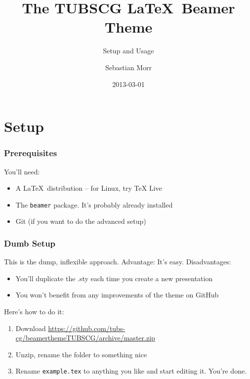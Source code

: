 \documentclass{beamer}
\title[TUBSCG Theme]{The TUBSCG \LaTeX\ Beamer Theme}
\subtitle{Setup and Usage}
\author[S.~Morr]{Sebastian Morr}
\institute{Computer Graphics Lab\\TU Braunschweig}
\date{2013-03-01}
\begin{document}
\begin{frame}
    \titlepage
\end{frame}

\section{Setup}

\begin{frame}
    \frametitle{Prerequisites}

    You'll need:

    \begin{itemize}
        \item A \LaTeX\ distribution -- for Linux, try \alert{TeX Live}
        \item The \texttt{beamer} package. It's probably already installed
        \item Git (if you want to do the advanced setup)
    \end{itemize}
\end{frame}

\begin{frame}
    \frametitle{Dumb Setup}

    This is the dump, inflexible approach. Advantage: It's easy. Disadvantages:
    
    \begin{itemize}
        \item You'll duplicate the .sty each time you create a new presentation
        \item You won't benefit from any improvements of the theme on GitHub
    \end{itemize}

    Here's how to do it:

    \begin{enumerate}
        \item Download \url{https://github.com/tubs-cg/beamerthemeTUBSCG/archive/master.zip}
        \item Unzip, rename the folder to something nice
        \item Rename \texttt{example.tex} to anything you like and start editing it. You're done.
    \end{enumerate}

\end{frame}
\end{document}
